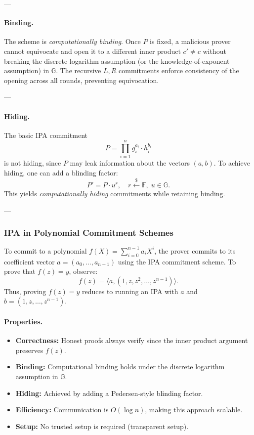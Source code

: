 ---

\paragraph{Binding.}

The scheme is \emph{computationally binding}.  
Once $P$ is fixed, a malicious prover cannot equivocate and open it to a different inner product $c' \neq c$ without breaking the discrete logarithm assumption (or the knowledge-of-exponent assumption) in $\mathbb{G}$.  
The recursive $L, R$ commitments enforce consistency of the opening across all rounds, preventing equivocation.

---

\paragraph{Hiding.}

The basic IPA commitment
\[
P = \prod_{i=1}^n g_i^{a_i} \cdot h_i^{b_i}
\]
is not hiding, since $P$ may leak information about the vectors $(a, b)$.  
To achieve hiding, one can add a blinding factor:
\[
P' = P \cdot u^r, \quad r \xleftarrow{\$} \mathbb{F}, \; u \in \mathbb{G}.
\]
This yields \emph{computationally hiding} commitments while retaining binding.

---

\subsubsection*{IPA in Polynomial Commitment Schemes}

To commit to a polynomial $f(X) = \sum_{i=0}^{n-1} a_i X^i$, the prover commits to its coefficient vector $a = (a_0, \dots, a_{n-1})$ using the IPA commitment scheme.  
To prove that $f(z) = y$, observe:
\[
f(z) = \langle a, (1, z, z^2, \dots, z^{n-1}) \rangle.
\]
Thus, proving $f(z) = y$ reduces to running an IPA with $a$ and $b = (1, z, \dots, z^{n-1})$.

\paragraph{Properties.}
\begin{itemize}
  \item \textbf{Correctness:} Honest proofs always verify since the inner product argument preserves $f(z)$.  
  \item \textbf{Binding:} Computational binding holds under the discrete logarithm assumption in $\mathbb{G}$.  
  \item \textbf{Hiding:} Achieved by adding a Pedersen-style blinding factor.  
  \item \textbf{Efficiency:} Communication is $O(\log n)$, making this approach scalable.  
  \item \textbf{Setup:} No trusted setup is required (transparent setup).
\end{itemize}

